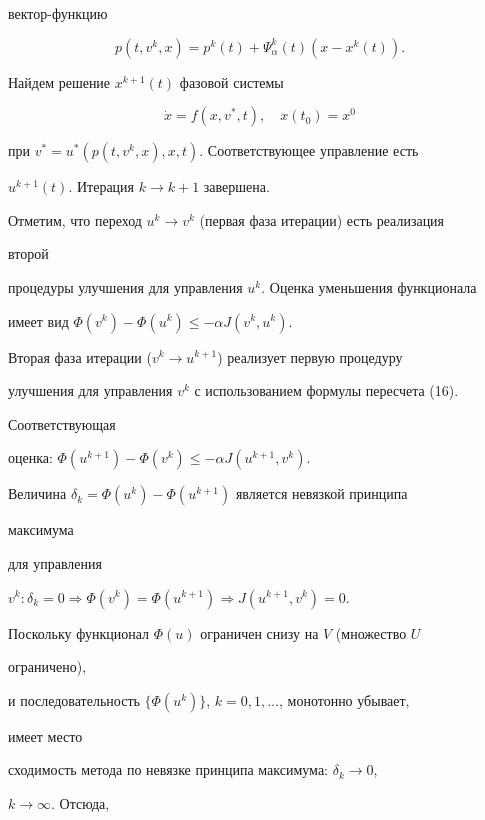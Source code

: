 вектор-функцию 


$$ 


p(t,v^k,x)=p^k(t)+\Psi^k_\alpha(t)(x-x^k(t)). 


$$ 


Найдем решение $x^{k+1}(t)$ фазовой системы 


$$ 


\Dot x=f(x,v^*,t),\quad x(t_0)=x^0 


$$ 


при $v^*=u^*(p(t,v^k,x),x,t)$. Соответствующее управление есть 


$u^{k+1}(t)$. Итерация $k\to k+1$ завершена. 


 


Отметим, что переход $u^k\to v^k$ (первая фаза итерации) есть реализация 


второй 


процедуры улучшения для управления $u^k$. Оценка уменьшения функционала 


имеет вид $\Phi(v^k)-\Phi(u^k)\le-\alpha J(v^k,u^k)$. 


 


Вторая фаза итерации ($v^k\to u^{k+1}$) реализует первую процедуру 


улучшения для управления $v^k$ с использованием формулы пересчета (16). 


Соответствующая 


оценка: $\Phi(u^{k+1})-\Phi(v^k)\le-\alpha J(u^{k+1},v^k)$. 


 


Величина $\delta_k=\Phi(u^k)-\Phi(u^{k+1})$ является невязкой принципа 


максимума 


для управления 


$v^k:\delta_k=0\Longrightarrow\Phi(v^k)=\Phi(u^{k+1}) 


\Longrightarrow J(u^{k+1},v^k)=0$. 


Поскольку функционал $\Phi(u)$ ограничен снизу на $V$ (множество $U$ 


ограничено), 


и последовательность $\{\Phi(u^k)\}$, $k=0,1,\dotsc$, монотонно убывает, 


имеет место 


сходимость метода по невязке принципа максимума: $\delta_k\to 0$, 


$k\to\infty$. Отсюда, 


